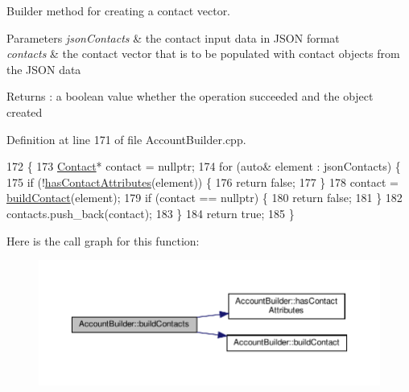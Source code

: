 Builder method for creating a contact vector.


\begin{DoxyParams}{Parameters}
{\em json\+Contacts} & the contact input data in J\+S\+ON format \\
\hline
{\em contacts} & the contact vector that is to be populated with contact objects from the J\+S\+ON data \\
\hline
\end{DoxyParams}
\begin{DoxyReturn}{Returns}
\+: a boolean value whether the operation succeeded and the object created 
\end{DoxyReturn}


Definition at line 171 of file Account\+Builder.\+cpp.


\begin{DoxyCode}
172 \{
173     \hyperlink{class_contact}{Contact}* contact = \textcolor{keyword}{nullptr};
174     \textcolor{keywordflow}{for} (\textcolor{keyword}{auto}& element : jsonContacts) \{
175         \textcolor{keywordflow}{if} (!\hyperlink{class_account_builder_a01b1fa1ec8d5eb397a6e61725d67f5a2}{hasContactAttributes}(element)) \{
176             \textcolor{keywordflow}{return} \textcolor{keyword}{false};
177         \}
178         contact = \hyperlink{class_account_builder_a3a3cc8d8beb8af6c0a9feb79e28adb59}{buildContact}(element);
179         \textcolor{keywordflow}{if} (contact == \textcolor{keyword}{nullptr}) \{
180             \textcolor{keywordflow}{return} \textcolor{keyword}{false};
181         \}
182         contacts.push\_back(contact);
183     \}
184     \textcolor{keywordflow}{return} \textcolor{keyword}{true};
185 \}
\end{DoxyCode}
Here is the call graph for this function\+:
\nopagebreak
\begin{figure}[H]
\begin{center}
\leavevmode
\includegraphics[width=350pt]{d9/daa/class_account_builder_aa3af3cf2501508d76ee3f7140deeba80_cgraph}
\end{center}
\end{figure}
